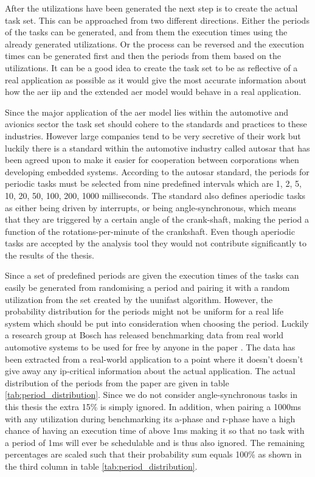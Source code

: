 \documentclass{kththesis}
\begin{document}
After the utilizations have been generated the next step is to create the actual task set. This can
be approached from two different directions. Either the periods of the tasks can be generated, and
from them the execution times using the already generated utilizations. Or the process can be
reversed and the execution times can be generated first and then the periods from them based on the
utilizations. It can be a good idea to create the task set to be as reflective of a real application
as possible as it would give the most accurate information about how the \acrshort{aer}
\acrshort{iip} and the extended \acrshort{aer} model would behave in a real application.

Since the major application of the \acrshort{aer} model lies within the automotive and avionics
sector the task set should cohere to the standards and practices to these industries.  However large
companies tend to be very secretive of their work but luckily there is a standard within the
automotive industry called \acrshort{autosar} that has been agreed upon to make it easier for
cooperation between corporations when developing embedded systems. According to the
\acrshort{autosar} standard, the periods for periodic tasks must be selected from nine predefined
intervals which are 1, 2, 5, 10, 20, 50, 100, 200, 1000 milliseconds. The standard also defines
aperiodic tasks as either being driven by interrupts, or being angle-synchronous, which means that
they are triggered by a certain angle of the crank-shaft, making the period a function of the
rotations-per-minute of the crankshaft. Even though aperiodic tasks are accepted by the analysis
tool they would not contribute significantly to the results of the thesis.

Since a set of predefined periods are given the execution times of the tasks can easily be generated
from randomising a period and pairing it with a random utilization from the set created by the
uunifast algorithm. However, the probability distribution for the periods might not be uniform for a
real life system which should be put into consideration when choosing the period. Luckily a research
group at Bosch has released benchmarking data from real world automotive systems to be used for
free by anyone in the paper \parencite{kramer_real_2015}.  The data has been extracted from a
real-world application to a point where it doesn't doesn't give away any \acrfull{ip}-critical
information about the actual application. The actual distribution of the periods from the paper are
given in table \ref{tab:period_distribution}. Since we do not consider angle-synchronous tasks in
this thesis the extra 15\% is simply ignored. In addition, when pairing a 1000ms with any
utilization during benchmarking its \acrshort{a}-phase and \acrshort{r}-phase have a high chance of
having an execution time of above 1ms making it so that no task with a period of 1ms will ever be
schedulable and is thus also ignored. The remaining percentages are scaled such that their
probability sum equals 100\% as shown in the third column in table \ref{tab:period_distribution}.
\end{document}
